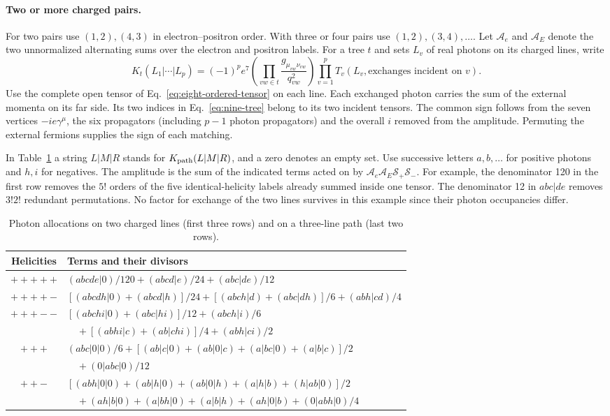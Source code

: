 \paragraph{Two or more charged pairs.}
For two pairs use $(1,2),(4,3)$ in electron--positron order. With
three or four pairs use $(1,2),(3,4),\ldots$. Let $\mathcal A_e$ and
$\mathcal A_E$ denote the two unnormalized alternating sums over the
electron and positron labels. For a tree $t$ and sets $L_v$ of real
photons on its charged lines, write
\begin{equation}
 K_t(L_1|\cdots|L_p)=(-1)^p e^7
 \left(\prod_{vw\in t}\frac{g_{\mu_{vw}\nu_{vw}}}{q_{vw}^2}\right)
 \prod_{v=1}^p T_v(L_v,\text{exchanges incident on }v).
 \label{eq:nine-tree}
\end{equation}
Use the complete open tensor of Eq.~\eqref{eq:eight-ordered-tensor}
on each line. Each exchanged photon carries the sum of the external
momenta on its far side. Its two indices in Eq.~\eqref{eq:nine-tree}
belong to its two incident tensors. The common sign follows from the
seven vertices $-ie\gamma^\mu$, the six propagators (including $p-1$
photon propagators) and the overall $i$ removed from the amplitude.
Permuting the external fermions supplies the sign of each matching.

In Table~\ref{tab:nine-occupations} a string $L|M|R$ stands for
$K_{\rm path}(L|M|R)$, and a zero denotes an empty set. Use successive
letters $a,b,\ldots$ for positive photons and $h,i$ for negatives.
The amplitude is the sum of the indicated terms acted on by
$\mathcal A_e\mathcal A_E\mathcal S_+\mathcal S_-$.
For example, the denominator 120 in the first row removes the $5!$
orders of the five identical-helicity labels already summed inside
one tensor. The denominator 12 in $abc|de$ removes $3!2!$ redundant
permutations. No factor for exchange of the two lines survives in
this example since their photon occupancies differ.
\begin{table}[htbp]
\centering\small
\begin{tabular}{cl}
\toprule
Helicities & Terms and their divisors \\
\midrule
$+++++$ & $(abcde|0)/120+(abcd|e)/24+(abc|de)/12$\\
$++++-$ & $[(abcdh|0)+(abcd|h)]/24+[(abch|d)+(abc|dh)]/6+(abh|cd)/4$\\
$+++--$ & $[(abchi|0)+(abc|hi)]/12+(abch|i)/6$\\
 & $\quad+[(abhi|c)+(ab|chi)]/4+(abh|ci)/2$\\
\midrule
$+++$ & $(abc|0|0)/6+[(ab|c|0)+(ab|0|c)+(a|bc|0)+(a|b|c)]/2$\\
 & $\quad +(0|abc|0)/12$\\
$++-$ & $[(abh|0|0)+(ab|h|0)+(ab|0|h)+(a|h|b)+(h|ab|0)]/2$\\
 & $\quad +(ah|b|0)+(a|bh|0)+(a|b|h)+(ah|0|b)+(0|abh|0)/4$\\
\bottomrule
\end{tabular}
\caption{Photon allocations on two charged lines (first three rows)
and on a three-line path (last two rows).}\label{tab:nine-occupations}
\end{table}


